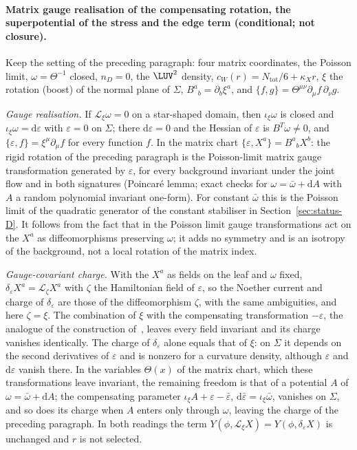 \paragraph{Matrix gauge realisation of the compensating rotation, the superpotential of the stress and the edge term (conditional; not closure).}
Keep the setting of the preceding paragraph: four matrix coordinates, the Poisson limit, \(\omega=\Theta^{-1}\) closed, \(n_D=0\), the \(\LUV^2\) density, \(c_W(r)=N_{\mathrm{tot}}/6+\kappa_Xr\), \(\xi\) the rotation (boost) of the normal plane of \(\Sigma\), \(B^a{}_b=\partial_b\xi^a\), and \(\{f,g\}=\Theta^{\mu\nu}\partial_\mu f\,\partial_\nu g\).

\emph{Gauge realisation.} If \(\mathcal L_\xi\omega=0\) on a star-shaped domain, then \(\iota_\xi\omega\) is closed and \(\iota_\xi\omega=\mathrm d\varepsilon\) with \(\varepsilon=0\) on \(\Sigma\); there \(\mathrm d\varepsilon=0\) and the Hessian of \(\varepsilon\) is \(B^{T}\omega\neq0\), and \(\{\varepsilon,f\}=\xi^\mu\partial_\mu f\) for every function \(f\). In the matrix chart \(\{\varepsilon,X^a\}=B^a{}_bX^b\): the rigid rotation of the preceding paragraph is the Poisson-limit matrix gauge transformation generated by \(\varepsilon\), for every background invariant under the joint flow and in both signatures (Poincar\'e lemma; exact checks for \(\omega=\bar\omega+\mathrm dA\) with \(A\) a random polynomial invariant one-form). For constant \(\bar\omega\) this is the Poisson limit of the quadratic generator of the constant stabiliser in Section~\ref{sec:status-D}. It follows from the fact that in the Poisson limit gauge transformations act on the \(X^a\) as diffeomorphisms preserving \(\omega\); it adds no symmetry and is an isotropy of the background, not a local rotation of the matrix index.

\emph{Gauge-covariant charge.} With the \(X^a\) as fields on the leaf and \(\omega\) fixed, \(\delta_\varepsilon X^a=\mathcal L_\zeta X^a\) with \(\zeta\) the Hamiltonian field of \(\varepsilon\), so the Noether current and charge of \(\delta_\varepsilon\) are those of the diffeomorphism \(\zeta\), with the same ambiguities, and here \(\zeta=\xi\). The combination of \(\xi\) with the compensating transformation \(-\varepsilon\), the analogue of the construction of~\cite{JacobsonMohd2015}, leaves every field invariant and its charge vanishes identically. The charge of \(\delta_\varepsilon\) alone equals that of \(\xi\): on \(\Sigma\) it depends on the second derivatives of \(\varepsilon\) and is nonzero for a curvature density, although \(\varepsilon\) and \(\mathrm d\varepsilon\) vanish there. In the variables \(\Theta(x)\) of the matrix chart, which these transformations leave invariant, the remaining freedom is that of a potential \(A\) of \(\omega=\bar\omega+\mathrm dA\); the compensating parameter \(\iota_\xi A+\varepsilon-\bar\varepsilon\), \(\mathrm d\bar\varepsilon=\iota_\xi\bar\omega\), vanishes on \(\Sigma\), and so does its charge when \(A\) enters only through \(\omega\), leaving the charge of the preceding paragraph. In both readings the term \(Y(\phi,\mathcal L_\xi X)=Y(\phi,\delta_\varepsilon X)\) is unchanged and \(r\) is not selected.

